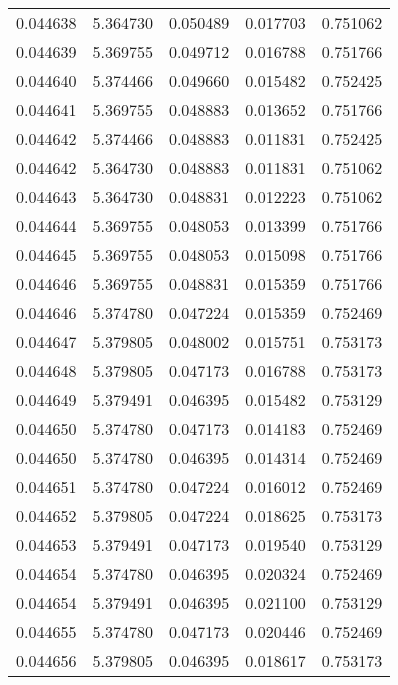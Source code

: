 \begin{tabular}{lrrrr}
0.044638    &  5.364730 &  0.050489 &  0.017703 &             0.751062 \\
0.044639    &  5.369755 &  0.049712 &  0.016788 &             0.751766 \\
0.044640    &  5.374466 &  0.049660 &  0.015482 &             0.752425 \\
0.044641    &  5.369755 &  0.048883 &  0.013652 &             0.751766 \\
0.044642    &  5.374466 &  0.048883 &  0.011831 &             0.752425 \\
0.044642    &  5.364730 &  0.048883 &  0.011831 &             0.751062 \\
0.044643    &  5.364730 &  0.048831 &  0.012223 &             0.751062 \\
0.044644    &  5.369755 &  0.048053 &  0.013399 &             0.751766 \\
0.044645    &  5.369755 &  0.048053 &  0.015098 &             0.751766 \\
0.044646    &  5.369755 &  0.048831 &  0.015359 &             0.751766 \\
0.044646    &  5.374780 &  0.047224 &  0.015359 &             0.752469 \\
0.044647    &  5.379805 &  0.048002 &  0.015751 &             0.753173 \\
0.044648    &  5.379805 &  0.047173 &  0.016788 &             0.753173 \\
0.044649    &  5.379491 &  0.046395 &  0.015482 &             0.753129 \\
0.044650    &  5.374780 &  0.047173 &  0.014183 &             0.752469 \\
0.044650    &  5.374780 &  0.046395 &  0.014314 &             0.752469 \\
0.044651    &  5.374780 &  0.047224 &  0.016012 &             0.752469 \\
0.044652    &  5.379805 &  0.047224 &  0.018625 &             0.753173 \\
0.044653    &  5.379491 &  0.047173 &  0.019540 &             0.753129 \\
0.044654    &  5.374780 &  0.046395 &  0.020324 &             0.752469 \\
0.044654    &  5.379491 &  0.046395 &  0.021100 &             0.753129 \\
0.044655    &  5.374780 &  0.047173 &  0.020446 &             0.752469 \\
0.044656    &  5.379805 &  0.046395 &  0.018617 &             0.753173 \\

\end{tabular}
